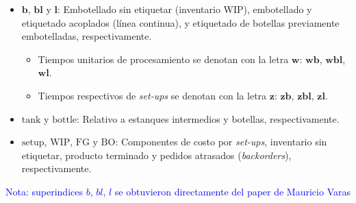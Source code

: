 \documentclass[11pt, letterpaper]{article}
\begin{document}
\begin{itemize}
    \item $\bm{b}$, $\bm{bl}$ y $\bm{l}$: Embotellado sin etiquetar (inventario WIP), embotellado y etiquetado acoplados (línea continua), y etiquetado de botellas
    previamente embotelladas, respectivamente.
    \begin{itemize}
        \item Tiempos unitarios de procesamiento se denotan con la letra $\bm{w}$: $\bm{wb}$, $\bm{wbl}$, $\bm{wl}$.

        \item Tiempos respectivos de \textit{set-ups} se denotan con la letra $\bm{z}$: $\bm{zb}$, $\bm{zbl}$, $\bm{zl}$.
    \end{itemize}

    \item $\bm{\mathrm{tank}}$ y $\bm{\mathrm{bottle}}$: Relativo a estanques intermedios y botellas, respectivamente.

    \item $\bm{\mathrm{setup}}$, $\bm{\mathrm{WIP}}$,
    $\bm{\mathrm{FG}}$ y $\bm{\mathrm{BO}}$: Componentes de costo por \textit{set-ups}, inventario sin etiquetar, producto terminado y pedidos atrasados (\textit{backorders}), respectivamente.
\end{itemize}

\textcolor{blue}{Nota: superindices $b$, $bl$, $l$ se obtuvieron directamente del paper de Mauricio Varas}

\end{document}
